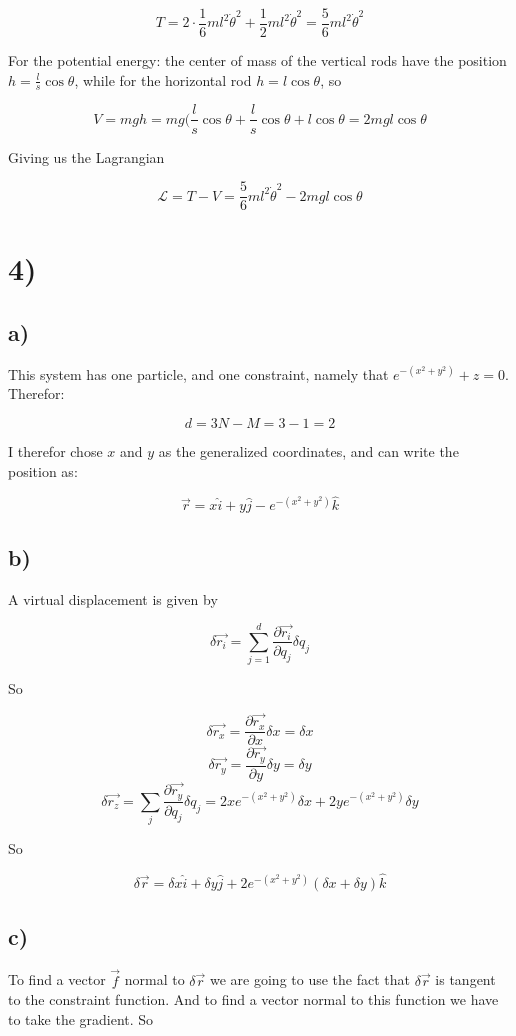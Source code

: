 \documentclass[a4paper,norsk, 10pt]{article}
\begin{document}
$$
T = 2\cdot \frac{1}{6}ml^2\dot{\theta}^2 + \frac{1}{2}ml^2\dot{\theta}^2 = \frac{5}{6}ml^2\dot{\theta}^2
$$

For the potential energy: the center of mass of the vertical rods have the position $ h = \frac{l}{s}\cos\theta$, while for the horizontal rod $h = l\cos\theta$, so

$$
V = mgh = mg(\frac{l}{s}\cos\theta + \frac{l}{s}\cos\theta + l\cos\theta = 2mgl\cos\theta
$$

Giving us the Lagrangian

$$
\mathcal{L} = T - V = \frac{5}{6}ml^2\dot{\theta}^2 - 2mgl\cos\theta
$$

\section*{4)}
\subsection*{a)}
This system has one particle, and one constraint, namely that $e^{-(x^2 + y^2)} + z = 0$. Therefor:

$$
d = 3N -M = 3 -1 = 2
$$

I therefor chose $x$ and $y$ as the generalized coordinates, and can write the position as:

$$
\vec{r} = x\hat{i} + y\hat{j} - e^{-(x^2 + y^2)}\hat{k}
$$

\subsection*{b)}
A virtual displacement is given by

$$
\delta \vec{r_i} = \sum_{j=1}^d \frac{\partial \vec{r_i}}{\partial q_j} \delta q_j
$$

So

$$
\delta\vec{r_x} = \frac{\partial \vec{r_x}}{\partial x} \delta x = \delta x 
$$
$$
\delta\vec{r_y} = \frac{\partial \vec{r_y}}{\partial y} \delta y = \delta y 
$$
$$
\delta \vec{r_z} = \sum_j \frac{\partial \vec{r_y}}{\partial q_j} \delta q_j = 2xe^{-(x^2 + y^2)} \delta x + 2y e^{-(x^2 + y^2)}\delta y
$$

So

$$
\delta \vec{r} = \delta x \hat{i} + \delta y \hat{j} + 2e^{-(x^2 + y^2)}(\delta x + \delta y)\hat{k}
$$

\subsection*{c)}
To find a vector $\vec{f}$ normal to $\delta \vec{r}$ we are going to use the fact that $\delta \vec{r}$ is tangent to the constraint function. And to find a vector normal to this function we have to take the gradient. So
\end{document}
